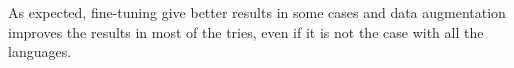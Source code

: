 \documentclass[11pt]{article}
\begin{document}
As expected, fine-tuning give better results in some cases and data augmentation improves the results in most of the tries, even if it is not the case with all the languages.





\end{document}
